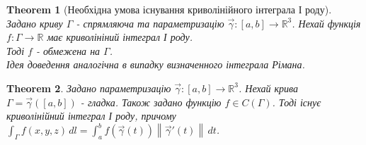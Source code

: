 \documentclass[a4paper, 10pt]{article}
\def\huge{\displaystyle}
\theoremstyle{theoremdd}
\newtheorem{theorem}{Theorem}[subsection]
\theoremstyle{theoremdd}
\theoremstyle{theoremdd}
\theoremstyle{theoremdd}
\theoremstyle{theoremdd}
\theoremstyle{theoremdd}
\theoremstyle{theoremdd}
\theoremstyle{theoremdd}
\theoremstyle{theoremdd}
\theoremstyle{theoremdd}
\theoremstyle{theoremdd}
\theoremstyle{theoremdd}
\theoremstyle{theoremdd}
\theoremstyle{theoremdd}
\theoremstyle{theoremdd}
\newcommand\Norm[1]{\left\lVert#1\right\rVert}
\begin{document}
\begin{theorem}[Необхідна умова існування криволінійного інтеграла І роду]
Задано криву $\Gamma$ - спрямляюча та параметризацію $\vec{\gamma}: [a,b] \to \mathbb{R}^3$. Нехай функція $f: \Gamma \to \mathbb{R}$ має криволініний інтеграл І роду.\\
Тоді $f$ - обмежена на $\Gamma$.\\
\textit{Ідея доведення аналогічна в випадку визначенного інтеграла Рімана.}
\end{theorem}

\begin{theorem}
Задано параметризацію $\vec{\gamma}: [a,b] \to \mathbb{R}^3$. Нехай крива $\Gamma = \vec{\gamma}([a,b])$ - гладка. Також задано функцію $f \in C(\Gamma)$. Тоді існує криволінійний інтеграл І роду, причому\\
$\huge\int_\Gamma f(x,y,z)\,dl = \int_a^b f(\vec{\gamma}(t)) \Norm{\vec{\gamma}'(t)}\,dt$.
\end{theorem}
\end{document}
